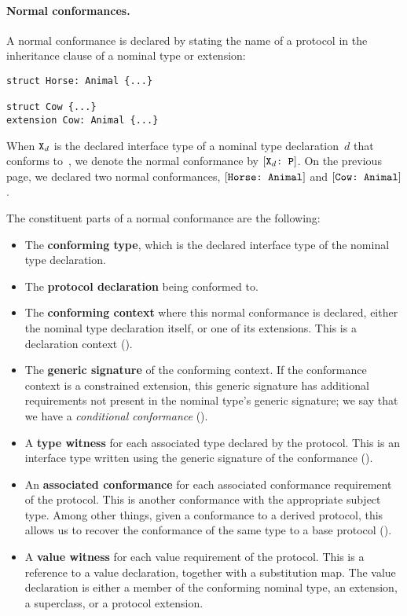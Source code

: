 \documentclass[../generics]{subfiles}
\begin{document}
\paragraph{Normal conformances.} A normal conformance is declared by stating the name of a protocol in the inheritance clause of a nominal type or extension:
\begin{Verbatim}
struct Horse: Animal {...}

struct Cow {...}
extension Cow: Animal {...}
\end{Verbatim}

When $\texttt{X}_d$ is the declared interface type of a nominal type declaration~$d$ that conforms to~\tP, we denote the normal conformance by $[\texttt{$\texttt{X}_d$:~P}]$. On the previous page, we declared two normal conformances, $[\texttt{Horse:~Animal}]$ and $[\texttt{Cow:~Animal}]$.

The constituent parts of a normal conformance are the following:
\begin{itemize}
\item The \textbf{conforming type}, which is the declared interface type of the nominal type declaration.
\item The \textbf{protocol declaration} being conformed to.
\item The \textbf{conforming context} where this normal conformance is declared, either the nominal type declaration itself, or one of its extensions. This is a declaration context ().
\item The \textbf{generic signature} of the conforming context. If the conformance context is a constrained extension, this generic signature has additional requirements not present in the nominal type's generic signature; we say that we have a \emph{conditional conformance} ().
\item A \textbf{type witness} for each associated type declared by the protocol. This is an interface type written using the generic signature of the conformance ().
\item An \textbf{associated conformance} for each associated conformance requirement of the protocol. This is another conformance with the appropriate subject type. Among other things, given a conformance to a derived protocol, this allows us to recover the conformance of the same type to a base protocol ().
\item A \textbf{value witness} for each value requirement of the protocol. This is a reference to a value declaration, together with a substitution map. The value declaration is either a member of the conforming nominal type, an extension, a superclass, or a protocol extension.
\end{itemize}
\end{document}
